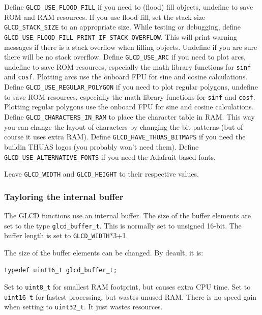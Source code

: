 \documentclass[12pt]{article}
\begin{document}
Define \lstinline|GLCD_USE_FLOOD_FILL| if you need to (flood) fill objects, undefine to save ROM  and RAM resources. If you use flood fill, set the stack size \lstinline|GLCD_STACK_SIZE| to an appropriate size. While testing or debugging, define \lstinline|GLCD_USE_FLOOD_FILL_PRINT_IF_STACK_OVERFLOW|. This will print warning messages if there is a stack overflow when filling objects. Undefine if you are sure there will be no stack overflow. Define \lstinline|GLCD_USE_ARC| if you need to plot arcs, undefine to save ROM resources, especially the math library functions for \lstinline|sinf| and \lstinline|cosf|. Plotting arcs use the onboard FPU for sine and cosine calculations. Define \lstinline|GLCD_USE_REGULAR_POLYGON| if you need to plot regular polygons, undefine to save ROM resources, especially the math library functions for \lstinline|sinf| and \lstinline|cosf|. Plotting regular polygons use the onboard FPU for sine and cosine calculations. Define \lstinline|GLCD_CHARACTERS_IN_RAM| to place the character table in RAM. This way you can change the layout of characters by changing the bit patterns (but of course it uses extra RAM). Define \lstinline|GLCD_HAVE_THUAS_BITMAPS| if you need the buildin THUAS logos (you probably won't need them).
Define \lstinline|GLCD_USE_ALTERNATIVE_FONTS| if you need the Adafruit based fonts.

Leave \lstinline|GLCD_WIDTH| and \lstinline|GLCD_HEIGHT| to their respective values.

\subsubsection{Tayloring the internal buffer}
\label{sec:taylorbuffer}
The GLCD functions use an internal buffer. The size of the buffer elements are set to the type \lstinline|glcd_buffer_t|. This is normally set to unsigned 16-bit. The buffer length is set to \lstinline|GLCD_WIDTH|*3+1.

The size of the buffer elements can be changed. By deault, it is:

\begin{lstlisting}
typedef uint16_t glcd_buffer_t;
\end{lstlisting}

Set to \lstinline|uint8_t| for smallest RAM footprint, but causes extra CPU time. Set to \lstinline|uint16_t| for fastest processing, but wastes unused RAM. There is no speed gain when setting to \lstinline|uint32_t|. It just wastes resources.
\end{document}
